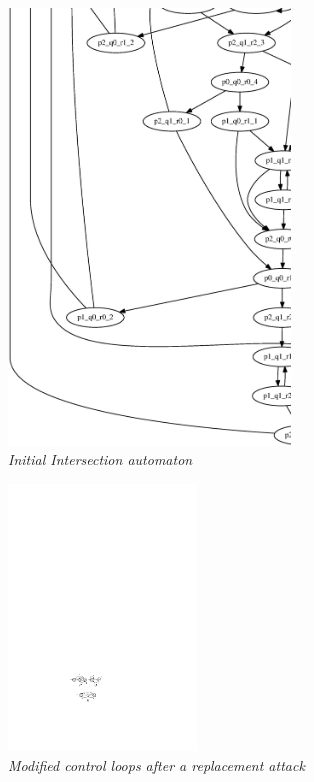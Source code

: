 \begin{figure}
\begin{center}
\includegraphics[width= 75mm]{graph.eps}
\end{center}
\caption{{\em Initial Intersection automaton}}
\label{state-transition}
\end{figure}

\begin{figure}
\begin{center}
\includegraphics[width= 50mm]{replaced.pdf}
\end{center}
\caption{{\em Modified control loops after a replacement attack}}
\label{replaced}
\end{figure}



